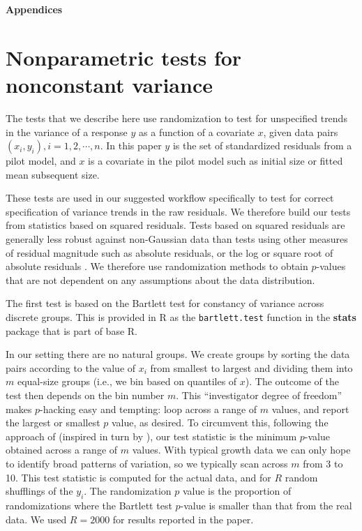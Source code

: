 \documentclass[12pt]{article}
\begin{document}
\newpage 
\clearpage 
\setcounter{equation}{0}
\setcounter{figure}{0}
\setcounter{section}{0}
\setcounter{table}{0}
\setcounter{Box}{0}
\renewcommand{\theequation}{S.\arabic{equation}}
\renewcommand{\thetable}{S-\arabic{table}}
\renewcommand{\thefigure}{S-\arabic{figure}}
\renewcommand{\theBox}{S-\arabic{Box}}
\renewcommand{\thesection}{S.\arabic{section}}

\centerline{\Large{\textbf{Appendices}}}

\section{Nonparametric tests for nonconstant variance}
\label{sec:VarianceTests}  

The tests that we describe here use randomization to test for unspecified trends in the variance of a response $y$ as a 
function of a covariate $x$, given data pairs $(x_i,y_i),  i = 1,2, \cdots, n$. 
In this paper $y$ is the set of standardized residuals from a pilot model, and $x$ is a covariate in the pilot model such as initial size or fitted mean subsequent size. 

These tests are used in our suggested workflow specifically to test for correct specification of variance trends in the raw residuals. We therefore build our
tests from statistics based on squared residuals. Tests based on squared residuals are generally less robust against non-Gaussian data than tests
using other measures of residual magnitude such as absolute residuals, or the log or square root of absolute residuals \citep{conover-etal-1981}. 
We therefore use randomization methods to obtain $p$-values that are not dependent on any assumptions about the data distribution. 

The first test is based on the Bartlett test for constancy of variance across discrete groups. This is  
provided in R as the \texttt{bartlett.test} function in the \textbf{stats} package that is part of base R. 

In our setting there are no natural groups. We create groups by sorting the data pairs according to the value of $x_i$ from smallest to largest 
and dividing them into $m$ equal-size groups (i.e., we bin based on quantiles of $x$). 
The outcome of the test then depends on the bin number $m$. This ``investigator degree of freedom'' makes $p$-hacking easy and tempting: 
loop across a range of $m$ values, and report the largest or smallest $p$ value, as desired. To circumvent this, following 
the approach of \citet{ye-Jensen-2020} (inspired in turn by \cite{sizer-99}), our test statistic is the minimum $p$-value obtained across a range of $m$ values.  
With typical growth data we can only hope to identify broad patterns of variation, so we typically scan across $m$ from 3 to 10. 
This test statistic is computed for the actual data, and for $R$ random shufflings of the $y_i$. The randomization $p$ value is the proportion of 
randomizations where the Bartlett test $p$-value is smaller than that from the real data. We used $R=2000$ for results reported in the paper.  
\end{document}
